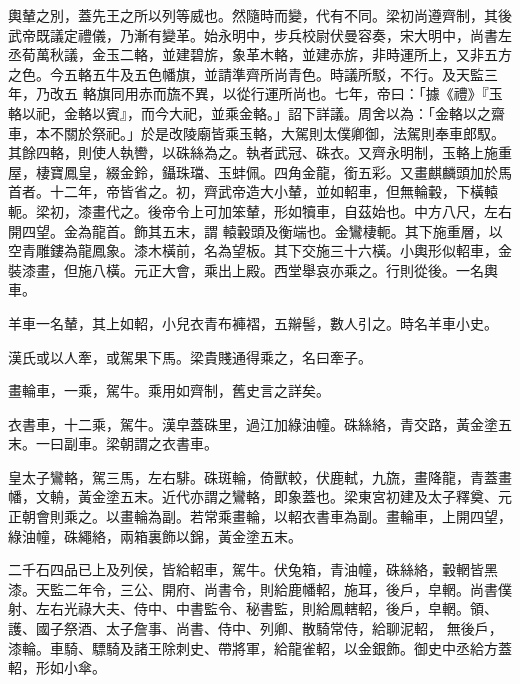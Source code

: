 
\begin{pinyinscope}

 輿輦之別，蓋先王之所以列等威也。然隨時而變，代有不同。梁初尚遵齊制，其後武帝既議定禮儀，乃漸有變革。始永明中，步兵校尉伏曼容奏，宋大明中，尚書左丞荀萬秋議，金玉二輅，並建碧旂，象革木輅，並建赤旂，非時運所上，又非五方之色。今五輅五牛及五色幡旗，並請準齊所尚青色。時議所駁，不行。及天監三年，乃改五
 輅旗同用赤而旒不異，以從行運所尚也。七年，帝曰：「據《禮》『玉輅以祀，金輅以賓』，而今大祀，並乘金輅。」詔下詳議。周舍以為：「金輅以之齋車，本不關於祭祀。」於是改陵廟皆乘玉輅，大駕則太僕卿御，法駕則奉車郎馭。其餘四輅，則使人執轡，以硃絲為之。執者武冠、硃衣。又齊永明制，玉輅上施重屋，棲寶鳳皇，綴金鈴，鑷珠璫、玉蚌佩。四角金龍，銜五彩。又畫麒麟頭加於馬首者。十二年，帝皆省之。初，齊武帝造大小輦，並如軺車，但無輪轂，下橫轅軛。梁初，漆畫代之。後帝令上可加笨輦，形如犢車，自茲始也。中方八尺，左右開四望。金為龍首。飾其五末，謂
 轅轂頭及衡端也。金鸞棲軛。其下施重層，以空青雕鏤為龍鳳象。漆木橫前，名為望板。其下交施三十六橫。小輿形似軺車，金裝漆畫，但施八橫。元正大會，乘出上殿。西堂舉哀亦乘之。行則從後。一名輿車。



 羊車一名輦，其上如軺，小兒衣青布褲褶，五辮髻，數人引之。時名羊車小史。



 漢氏或以人牽，或駕果下馬。梁貴賤通得乘之，名曰牽子。



 畫輪車，一乘，駕牛。乘用如齊制，舊史言之詳矣。



 衣書車，十二乘，駕牛。漢皁蓋硃里，過江加綠油幢。硃絲絡，青交路，黃金塗五末。一曰副車。梁朝謂之衣書車。



 皇太子鸞輅，駕三馬，左右騑。硃斑輪，倚獸較，伏鹿軾，九旒，畫降龍，青蓋畫幡，文輈，黃金塗五末。近代亦謂之鸞輅，即象蓋也。梁東宮初建及太子釋奠、元正朝會則乘之。以畫輪為副。若常乘畫輪，以軺衣書車為副。畫輪車，上開四望，綠油幢，硃繩絡，兩箱裏飾以錦，黃金塗五末。



 二千石四品已上及列侯，皆給軺車，駕牛。伏兔箱，青油幢，硃絲絡，轂輞皆黑漆。天監二年令，三公、開府、尚書令，則給鹿幡軺，施耳，後戶，皁輞。尚書僕射、左右光祿大夫、侍中、中書監令、秘書監，則給鳳轄軺，後戶，皁輞。領、護、國子祭酒、太子詹事、尚書、侍中、列卿、散騎常侍，給聊泥軺，
 無後戶，漆輪。車騎、驃騎及諸王除刺史、帶將軍，給龍雀軺，以金銀飾。御史中丞給方蓋軺，形如小傘。




\end{pinyinscope}
